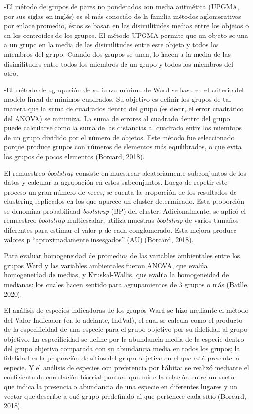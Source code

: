 \documentclass[11pt,]{article}
\begin{document}
-El método de grupos de pares no ponderados con media aritmética (UPGMA,
por sus siglas en inglés) es el más conocido de la familia métodos
aglomerativos por enlace promedio, éstos se basan en las disimilitudes
medias entre los objetos o en los centroides de los grupos. El método
UPGMA permite que un objeto se una a un grupo en la media de las
disimilitudes entre este objeto y todos los miembros del grupo. Cuando
dos grupos se unen, lo hacen a la media de las disimilitudes entre todos
los miembros de un grupo y todos los miembros del otro.

-El método de agrupación de varianza mínima de Ward se basa en el
criterio del modelo lineal de mínimos cuadrados. Su objetivo es definir
los grupos de tal manera que la suma de cuadrados dentro del grupo (es
decir, el error cuadrático del ANOVA) se minimiza. La suma de errores al
cuadrado dentro del grupo puede calcularse como la suma de las
distancias al cuadrado entre los miembros de un grupo dividido por el
número de objetos. Este método fue seleccionado porque produce grupos
con números de elementos más equilibrados, o que evita los grupos de
pocos elementos (Borcard, 2018).

El remuestreo \emph{bootstrap} consiste en muestrear aleatoriamente
subconjuntos de los datos y calcular la agrupación en estos
subconjuntos. Luego de repetir este proceso un gran número de veces, se
cuenta la proporción de los resultados de clustering replicados en los
que aparece un cluster determinado. Esta proporción se denomina
probabilidad \emph{bootstrap} (BP) del cluster. Adicionalmente, se
aplicó el remuestreo \emph{bootstrap} multiescalar, utiliza muestras
\emph{bootstrap} de varios tamaños diferentes para estimar el valor p de
cada conglomerado. Esta mejora produce valores p ``aproximadamente
insesgados'' (AU) (Borcard, 2018).

Para evaluar homogeneidad de promedios de las variables ambientales
entre los grupos Ward y las variables ambientales fueron ANOVA, que
evalúa homogeneidad de medias, y Kruskal-Wallis, que evalúa la
homogeneidad de medianas; los cuales hacen sentido para agrupamientos de
3 grupos o más (Batlle, 2020).

El análisis de especies indicadoras de los grupos Ward se hizo mediante
el método del Valor Indicador (en lo adelante, IndVal), el cual se
calcula como el producto de la especificidad de una especie para el
grupo objetivo por su fidelidad al grupo objetivo. La especificidad se
define por la abundancia media de la especie dentro del grupo objetivo
comparada con su abundancia media en todos los grupos; la fidelidad es
la proporción de sitios del grupo objetivo en el que está presente la
especie. Y el análisis de especies con preferencia por hábitat se
realizó mediante el coeficiente de correlación biserial puntual que mide
la relación entre un vector que indica la presencia o abundancia de una
especie en diferentes lugares y un vector que describe a qué grupo
predefinido al que pertenece cada sitio (Borcard, 2018).
\end{document}
